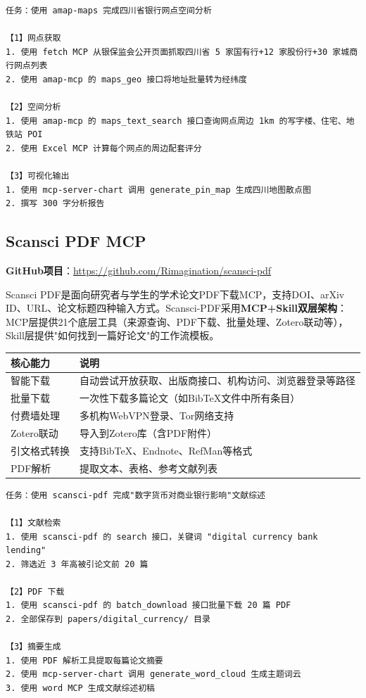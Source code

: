 \begin{lstlisting}
任务：使用 amap-maps 完成四川省银行网点空间分析

【1】网点获取
1. 使用 fetch MCP 从银保监会公开页面抓取四川省 5 家国有行+12 家股份行+30 家城商行网点列表
2. 使用 amap-mcp 的 maps_geo 接口将地址批量转为经纬度

【2】空间分析
1. 使用 amap-mcp 的 maps_text_search 接口查询网点周边 1km 的写字楼、住宅、地铁站 POI
2. 使用 Excel MCP 计算每个网点的周边配套评分

【3】可视化输出
1. 使用 mcp-server-chart 调用 generate_pin_map 生成四川地图散点图
2. 撰写 300 字分析报告
\end{lstlisting}

\subsection{Scansci PDF MCP}

\textbf{GitHub项目}：\url{https://github.com/Rimagination/scansci-pdf}

Scansci PDF是面向研究者与学生的学术论文PDF下载MCP，支持DOI、arXiv ID、URL、论文标题四种输入方式。Scansci-PDF采用\textbf{MCP+Skill双层架构}：MCP层提供21个底层工具（来源查询、PDF下载、批量处理、Zotero联动等），Skill层提供"如何找到一篇好论文"的工作流模板。

\begin{table}[H]
\centering
\small
\begin{tabular}{lp{9cm}}
\toprule
\textbf{核心能力} & \textbf{说明} \\
\midrule
智能下载 & 自动尝试开放获取、出版商接口、机构访问、浏览器登录等路径 \\
批量下载 & 一次性下载多篇论文（如BibTeX文件中所有条目） \\
付费墙处理 & 多机构WebVPN登录、Tor网络支持 \\
Zotero联动 & 导入到Zotero库（含PDF附件） \\
引文格式转换 & 支持BibTeX、Endnote、RefMan等格式 \\
PDF解析 & 提取文本、表格、参考文献列表 \\
\bottomrule
\end{tabular}
\end{table}

\begin{lstlisting}
任务：使用 scansci-pdf 完成"数字货币对商业银行影响"文献综述

【1】文献检索
1. 使用 scansci-pdf 的 search 接口，关键词 "digital currency bank lending"
2. 筛选近 3 年高被引论文前 20 篇

【2】PDF 下载
1. 使用 scansci-pdf 的 batch_download 接口批量下载 20 篇 PDF
2. 全部保存到 papers/digital_currency/ 目录

【3】摘要生成
1. 使用 PDF 解析工具提取每篇论文摘要
2. 使用 mcp-server-chart 调用 generate_word_cloud 生成主题词云
3. 使用 word MCP 生成文献综述初稿
\end{lstlisting}

